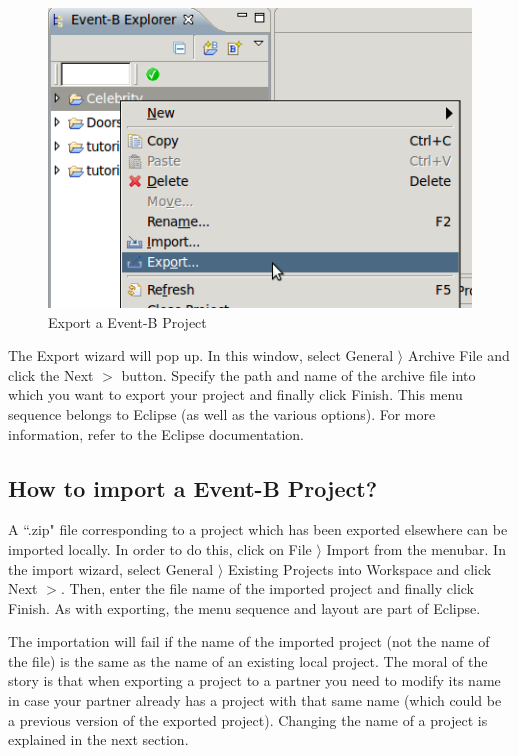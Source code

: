 \begin{figure}[!ht]
\begin{center}
	\includegraphics{img/faq/faq_exportproject.png}
	\caption{Export a Event-B Project}
	\label{fig_faq_exportproject}
\end{center}
\end{figure}

The Export wizard will pop up. In this window, select \textsf{General $\rangle$ Archive File} and click the \textsf{Next $>$} button. Specify the path and name of the archive file into which you want to export your project and finally click \textsf{Finish}. This menu sequence belongs to Eclipse (as well as the various options). For more information, refer to the Eclipse documentation. 

\subsection{How to import a Event-B Project?}

A ``.zip" file corresponding to a project which has been exported elsewhere can be imported locally. In order to do this, click on \textsf{File $\rangle$ Import} from the menubar. In the import wizard, select \textsf{General $\rangle$ Existing Projects into Workspace} and click \textsf{Next $>$}. Then, enter the file name of the imported project and finally click \textsf{Finish}. As with exporting, the menu sequence and layout are part of Eclipse.

The importation will fail if the name of the imported project (not the name of the file) is the same as the name of an existing local project. The moral of the story is that when exporting a project to a partner you need to modify its name in case your partner already has a project with that same name (which could be a previous version of the exported project). Changing the name of a project is explained in the next section. 

